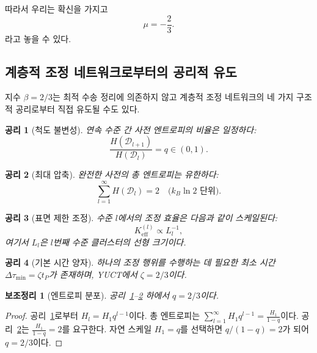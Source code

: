 \documentclass[11pt,a4paper]{article}
\newtheorem{lemma}{보조정리}[section]
\newtheorem{axiom}{공리}[section]
\begin{document}
	따라서 우리는 확신을 가지고
	\[
	\mu = -\frac{2}{3}. \label{eq:mu}
	\]
	라고 놓을 수 있다.
	
	\subsection{계층적 조정 네트워크로부터의 공리적 유도}
	\label{subsec:axiomatic-beta}
	
	지수 \(\beta = 2/3\)는 최적 수송 정리에 의존하지 않고 계층적 조정 네트워크의 네 가지 구조적 공리로부터 직접 유도될 수도 있다.
	
	\begin{axiom}[척도 불변성]
		\label{ax:A1}
		연속 수준 간 사전 엔트로피의 비율은 일정하다:
		\[
		\frac{H(\mathcal{D}_{l+1})}{H(\mathcal{D}_l)} = q \in (0,1).
		\]
	\end{axiom}
	
	\begin{axiom}[최대 압축]
		\label{ax:A2}
		완전한 사전의 총 엔트로피는 유한하다:
		\[
		\sum_{l=1}^{\infty} H(\mathcal{D}_l) = 2 \quad \text{(} k_B\ln 2 \text{ 단위)}.
		\]
	\end{axiom}
	
	\begin{axiom}[표면 제한 조정]
		\label{ax:A3}
		수준 \(l\)에서의 조정 효율은 다음과 같이 스케일된다:
		\[
		K_{\mathrm{eff}}^{(l)} \propto L_l^{-1},
		\]
		여기서 \(L_l\)은 \(l\)번째 수준 클러스터의 선형 크기이다.
	\end{axiom}
	
	\begin{axiom}[기본 시간 양자]
		\label{ax:A4}
		하나의 조정 행위를 수행하는 데 필요한 최소 시간 \(\Delta\tau_{\min} = \zeta t_P\)가 존재하며, YUCT에서 \(\zeta = 2/3\)이다.
	\end{axiom}
	
	\begin{lemma}[엔트로피 분포]
		\label{lem:entropy}
		공리~\ref{ax:A1}--\ref{ax:A2} 하에서 \(q = 2/3\)이다.
	\end{lemma}
	\begin{proof}
		공리~\ref{ax:A1}로부터 \(H_l = H_1 q^{l-1}\)이다. 총 엔트로피는 \(\sum_{l=1}^{\infty} H_1 q^{l-1} = \frac{H_1}{1-q}\)이다. 공리~\ref{ax:A2}는 \(\frac{H_1}{1-q}=2\)를 요구한다. 자연 스케일 \(H_1 = q\)를 선택하면 \(q/(1-q) = 2\)가 되어 \(q = 2/3\)이다.
	\end{proof}
	
\end{document}
